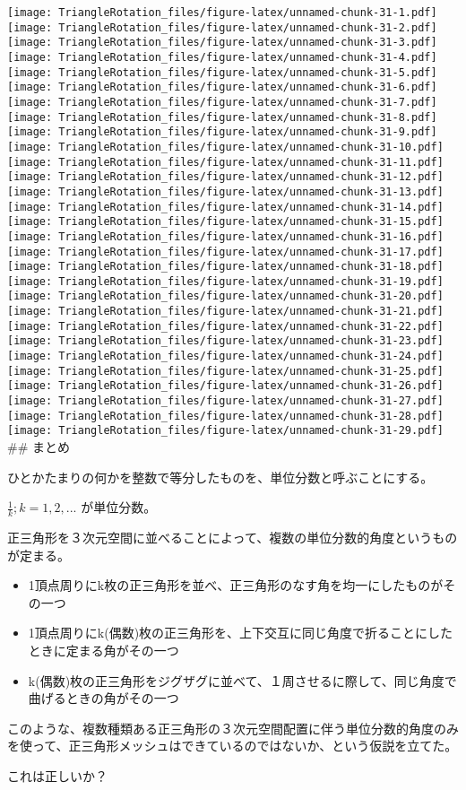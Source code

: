 \documentclass[]{article}
\providecommand{\tightlist}{%
  \setlength{\itemsep}{0pt}\setlength{\parskip}{0pt}}
\begin{document}
\texttt{[image: TriangleRotation\_files/figure-latex/unnamed-chunk-31-1.pdf]}
\texttt{[image: TriangleRotation\_files/figure-latex/unnamed-chunk-31-2.pdf]}
\texttt{[image: TriangleRotation\_files/figure-latex/unnamed-chunk-31-3.pdf]}
\texttt{[image: TriangleRotation\_files/figure-latex/unnamed-chunk-31-4.pdf]}
\texttt{[image: TriangleRotation\_files/figure-latex/unnamed-chunk-31-5.pdf]}
\texttt{[image: TriangleRotation\_files/figure-latex/unnamed-chunk-31-6.pdf]}
\texttt{[image: TriangleRotation\_files/figure-latex/unnamed-chunk-31-7.pdf]}
\texttt{[image: TriangleRotation\_files/figure-latex/unnamed-chunk-31-8.pdf]}
\texttt{[image: TriangleRotation\_files/figure-latex/unnamed-chunk-31-9.pdf]}
\texttt{[image: TriangleRotation\_files/figure-latex/unnamed-chunk-31-10.pdf]}
\texttt{[image: TriangleRotation\_files/figure-latex/unnamed-chunk-31-11.pdf]}
\texttt{[image: TriangleRotation\_files/figure-latex/unnamed-chunk-31-12.pdf]}
\texttt{[image: TriangleRotation\_files/figure-latex/unnamed-chunk-31-13.pdf]}
\texttt{[image: TriangleRotation\_files/figure-latex/unnamed-chunk-31-14.pdf]}
\texttt{[image: TriangleRotation\_files/figure-latex/unnamed-chunk-31-15.pdf]}
\texttt{[image: TriangleRotation\_files/figure-latex/unnamed-chunk-31-16.pdf]}
\texttt{[image: TriangleRotation\_files/figure-latex/unnamed-chunk-31-17.pdf]}
\texttt{[image: TriangleRotation\_files/figure-latex/unnamed-chunk-31-18.pdf]}
\texttt{[image: TriangleRotation\_files/figure-latex/unnamed-chunk-31-19.pdf]}
\texttt{[image: TriangleRotation\_files/figure-latex/unnamed-chunk-31-20.pdf]}
\texttt{[image: TriangleRotation\_files/figure-latex/unnamed-chunk-31-21.pdf]}
\texttt{[image: TriangleRotation\_files/figure-latex/unnamed-chunk-31-22.pdf]}
\texttt{[image: TriangleRotation\_files/figure-latex/unnamed-chunk-31-23.pdf]}
\texttt{[image: TriangleRotation\_files/figure-latex/unnamed-chunk-31-24.pdf]}
\texttt{[image: TriangleRotation\_files/figure-latex/unnamed-chunk-31-25.pdf]}
\texttt{[image: TriangleRotation\_files/figure-latex/unnamed-chunk-31-26.pdf]}
\texttt{[image: TriangleRotation\_files/figure-latex/unnamed-chunk-31-27.pdf]}
\texttt{[image: TriangleRotation\_files/figure-latex/unnamed-chunk-31-28.pdf]}
\texttt{[image: TriangleRotation\_files/figure-latex/unnamed-chunk-31-29.pdf]}
\#\# まとめ

ひとかたまりの何かを整数で等分したものを、単位分数と呼ぶことにする。

\(\frac{1}{k}; k = 1,2,...\) が単位分数。

正三角形を３次元空間に並べることによって、複数の単位分数的角度というものが定まる。

\begin{itemize}
\tightlist
\item
  1頂点周りにk枚の正三角形を並べ、正三角形のなす角を均一にしたものがその一つ
\item
  1頂点周りにk(偶数)枚の正三角形を、上下交互に同じ角度で折ることにしたときに定まる角がその一つ
\item
  k(偶数)枚の正三角形をジグザグに並べて、１周させるに際して、同じ角度で曲げるときの角がその一つ
\end{itemize}

このような、複数種類ある正三角形の３次元空間配置に伴う単位分数的角度のみを使って、正三角形メッシュはできているのではないか、という仮説を立てた。

これは正しいか？
\end{document}
